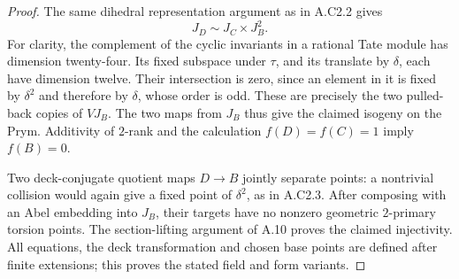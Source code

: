 \begin{proof}
The same dihedral representation argument as in A.C2.2 gives
\[
                           J_D\sim J_C\times J_B^2.
\]
For clarity, the complement of the cyclic invariants in a rational
Tate module has dimension twenty-four. Its fixed subspace under
$\tau$, and its translate by $\delta$, each have dimension twelve.
Their intersection is zero, since an element in it is fixed by
$\delta^2$ and therefore by $\delta$, whose order is odd.
These are precisely the two pulled-back copies of $VJ_B$.
The two maps from $J_B$ thus give the claimed isogeny on the Prym.
Additivity of $2$-rank and the calculation $f(D)=f(C)=1$ imply
$f(B)=0$.

Two deck-conjugate quotient maps $D\to B$ jointly separate points:
a nontrivial collision would again give a fixed point of
$\delta^2$, as in A.C2.3. After composing with an Abel embedding
into $J_B$, their targets have no nonzero geometric $2$-primary
torsion points. The section-lifting argument of A.10 proves the
claimed injectivity. All equations, the deck transformation and
chosen base points are defined after finite extensions; this proves
the stated field and form variants.
\end{proof}
